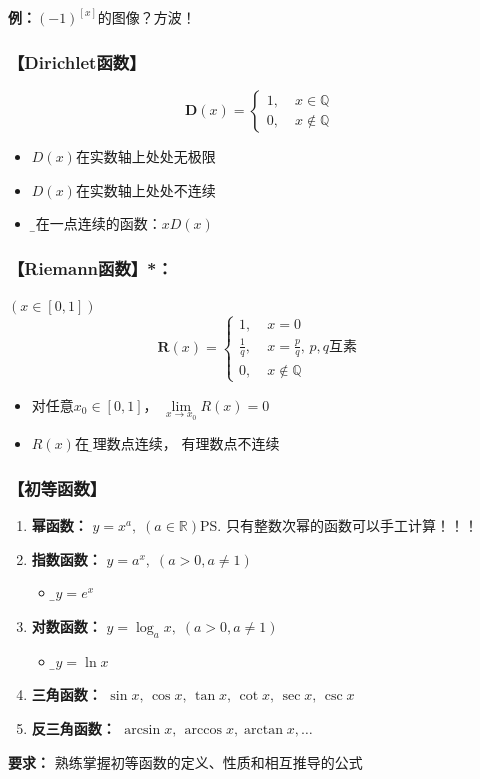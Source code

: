{\bf 例：}$(-1)^{[x]}$的图像？方波！

\subsubsection{\bf 【Dirichlet函数】}
  $$\bm{D}(x) =\left\{
  \begin{array}{ll}
  	1,\;& x\in\mathbb{Q} \\
  	0,\;& x\notin\mathbb{Q}
  \end{array}
  \right.$$
  \begin{itemize}
    \item $D(x)$在实数轴上处处无极限
	\item $D(x)$在实数轴上处处不连续
	\item {\b 仅在一点连续的函数：}$xD(x)$
  \end{itemize}

\subsubsection{\bf 【Riemann函数】*：} 

$(x\in[0,1])$
  $$\bm{R}(x) =\left\{
	\begin{array}{ll}
	1,\;&x=0\\
	\displaystyle\frac 1q,\;&x=\displaystyle\frac pq,\,p,q\mbox{互素}\\
	0,\;&x\notin\mathbb{Q}
	\end{array}
  \right. $$
  \begin{itemize}
    \item 对任意$x_0\in[0,1]$， $\lim\limits_{x\to x_0}R(x)=0$
    \vspace{1ex}
    \item $R(x)$在{\b 无理数点连续， 有理数点不连续}
  \end{itemize}

\subsubsection{【初等函数】}

\begin{enumerate}
  \item {\bf 幂函数：} $y=x^a,\; (a\in\mathbb{R})$\ps{只有整数次幂的函数可以手工计算！！！}
  \item {\bf 指数函数：} $y=a^x,\; (a>0,a\ne 1)$
  \begin{itemize}
    \item {\b $y=e^x$}
  \end{itemize}
  \item {\bf 对数函数：} $y=\log_ax,\; (a>0,a\ne 1)$
  \begin{itemize}
    \item {\b$y=\ln x$}
  \end{itemize}
  \item {\bf 三角函数：} $\sin x, \,\cos x,\, \tan x, \,\cot
  x,\, \sec x,\, \csc x$
  \item {\bf 反三角函数：} $\arcsin x, \,\arccos x, \arctan x,
  \ldots$
\end{enumerate}
{\bf{要求：}} 熟练掌握初等函数的定义、性质和相互推导的公式


